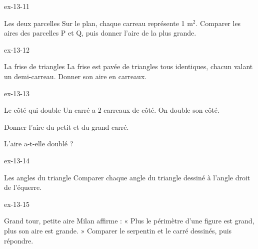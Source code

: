 \begin{blocLivre}{ex-13-11}\begin{exercice}[3]{Les deux parcelles}
Sur le plan, chaque carreau représente 1 $\mathrm m^2$. Comparer les aires des parcelles P et Q, puis donner l’aire de la plus grande.
\label{fig-ex-13-11}
\end{exercice}\end{blocLivre}
\begin{blocLivre}{ex-13-12}\begin{exercice}[3]{La frise de triangles}
La frise est pavée de triangles tous identiques, chacun valant un demi-carreau. Donner son aire en carreaux.
\label{fig-ex-13-12}
\end{exercice}\end{blocLivre}
\begin{blocLivre}{ex-13-13}\begin{exercice}[3]{Le côté qui double}
Un carré a 2 carreaux de côté. On double son côté.\begin{questions}
\item Donner l’aire du petit et du grand carré.
\item L’aire a-t-elle doublé ?
\end{questions}
\label{fig-ex-13-13}
\end{exercice}\end{blocLivre}
\begin{blocLivre}{ex-13-14}\begin{exercice}[3]{Les angles du triangle}
Comparer chaque angle du triangle dessiné à l’angle droit de l’équerre.
\label{fig-ex-13-14}
\end{exercice}\end{blocLivre}
\begin{blocLivre}{ex-13-15}\begin{exercice}[3]{Grand tour, petite aire}
Milan affirme : « Plus le périmètre d’une figure est grand, plus son aire est grande. » Comparer le serpentin et le carré dessinés, puis répondre.
\label{fig-ex-13-15}
\end{exercice}\end{blocLivre}

\clearpage

